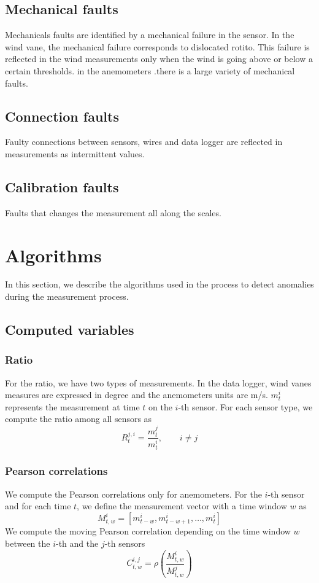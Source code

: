 \documentclass[journal]{IEEEtran}
\begin{document}
\subsection{Mechanical faults} Mechanicals faults are identified by a mechanical failure in the sensor. In the wind vane, the mechanical failure corresponds to dislocated rotito. This failure is reflected in the wind measurements only when the wind is going above or below a certain thresholds.
in the anemometers .there is a large variety of mechanical faults.  
\subsection{Connection  faults} Faulty connections between sensors, wires and data logger are reflected in measurements as intermittent values. 
\subsection{Calibration faults} 
Faults that changes the measurement all along the scales.


\section{Algorithms}\label{sec:algorithms}
In this section, we describe the algorithms used in the process to detect anomalies during the measurement process.  
\subsection{Computed variables}
\subsubsection{Ratio}
For the ratio, we have two types of measurements. In the data logger, wind vanes measures are expressed in degree and the anemometers units are m/s.  $m_t^{i}$ represents the measurement at time $t$ on the $i$-th sensor.
For each sensor type, we compute the ratio among all sensors as 
\begin{equation} 
R_{t}^{j,i} = \frac{m_{t}^{j}}{m_{t}^{i}},\qquad i \neq j 
\end{equation}


\subsubsection{Pearson correlations}
We compute the Pearson correlations only for anemometers. For the $i$-th sensor and for each time $t$, we define the measurement vector with a time window $w$ as 
\begin{equation}
M^i_{t,w} = [m_{t-w}^i,m_{t-w+1}^i,\ldots,m_t^i]
\end{equation}
We compute the moving Pearson correlation depending on the time window $w$ between the $i$-th and the $j$-th sensors
\begin{equation}
C^{i,j}_{t,w}= \rho\left( \frac{M^i_{t,w}}{M^j_{t,w}}\right)
\end{equation}
\end{document}
